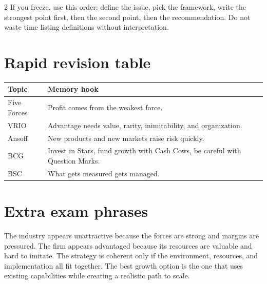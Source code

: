 \documentclass[8pt,letterpaper]{article}
\newcommand{\term}[1]{\textbf{#1}}
\begin{document}
\begin{multicols}{2}
If you freeze, use this order: define the issue, pick the framework, write the strongest point first, then the second point, then the recommendation. Do not waste time listing definitions without interpretation.

\section*{Rapid revision table}
\begin{tabular}{@{}p{1.6cm}p{4.9cm}@{}}
\toprule
\term{Topic} & \term{Memory hook} \\
\midrule
Five Forces & Profit comes from the weakest force. \\
VRIO & Advantage needs value, rarity, inimitability, and organization. \\
Ansoff & New products and new markets raise risk quickly. \\
BCG & Invest in Stars, fund growth with Cash Cows, be careful with Question Marks. \\
BSC & What gets measured gets managed. \\
\bottomrule
\end{tabular}

\section*{Extra exam phrases}
The industry appears unattractive because the forces are strong and margins are pressured. The firm appears advantaged because its resources are valuable and hard to imitate. The strategy is coherent only if the environment, resources, and implementation all fit together. The best growth option is the one that uses existing capabilities while creating a realistic path to scale.

\end{multicols}
\end{document}
